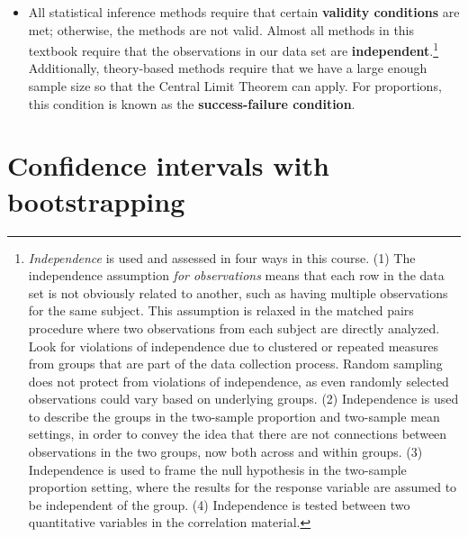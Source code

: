 \documentclass[
  10pt,
  openany]{book}
\providecommand{\tightlist}{%
  \setlength{\itemsep}{0pt}\setlength{\parskip}{0pt}}
\theoremstyle{definition}
\theoremstyle{definition}
\theoremstyle{definition}
\theoremstyle{definition}
\theoremstyle{remark}
\begin{document}
\begin{itemize}
  \begin{itemize}
  \tightlist
  \item
    A small p-value indicates that the observed data would have been unusual if the null hypothesis were true, and thus we have evidence against the null hypothesis.
  \item
    A p-value that is not small indicates that the observed data are plausible under the assumption of the null hypothesis, and thus we do not have evidence against the null hypothesis.
  \end{itemize}
\item
  All statistical inference methods require that certain \textbf{validity conditions} are met; otherwise, the methods are not valid. Almost all methods in this textbook require that the observations in our data set are \textbf{independent}.\footnote{\emph{Independence} is used and assessed in four ways in this course. (1) The independence assumption \emph{for observations} means that each row in the data set is not obviously related to another, such as having multiple observations for the same subject. This assumption is relaxed in the matched pairs procedure where two observations from each subject are directly analyzed. Look for violations of independence due to clustered or repeated measures from groups that are part of the data collection process. Random sampling does not protect from violations of independence, as even randomly selected observations could vary based on underlying groups. (2) Independence is used to describe the groups in the two-sample proportion and two-sample mean settings, in order to convey the idea that there are not connections between observations in the two groups, now both across and within groups. (3) Independence is used to frame the null hypothesis in the two-sample proportion setting, where the results for the response variable are assumed to be independent of the group. (4) Independence is tested between two quantitative variables in the correlation material.} Additionally, theory-based methods require that we have a large enough sample size so that the Central Limit Theorem can apply. For proportions, this condition is known as the \textbf{success-failure condition}.
\end{itemize}

\chapter{Confidence intervals with bootstrapping}\label{foundations-bootstrapping}
\end{document}
